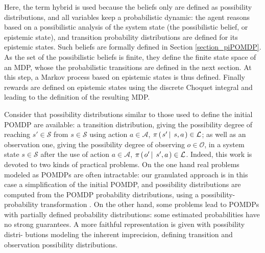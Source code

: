 Here, the term hybrid is used because the beliefs only
are defined as possibility distributions, and all variables keep a probabilistic dynamic:
the agent reasons based on a possibilistic analysis of the system state (the possibilistic belief,
or epistemic state), and transition probability distributions are defined for its epistemic states. 
Such beliefs are formally defined in Section \ref{section_piPOMDP}.
As the set of the possibilistic beliefs is finite, 
they define the finite state space of an MDP, 
whose the probabilistic transitions are defined in the next section.
At this step, a Markov process based on epistemic states
is thus defined. 
Finally rewards are defined on epistemic states 
using the discrete Choquet integral
and leading to the definition of the resulting MDP.

Consider that possibility distributions similar to those used to define the initial
POMDP are available: a transition distribution, giving the possibility degree of
reaching $s' \in \mathcal{S}$ from $s \in \mathcal{S}$
using action $a \in \mathcal{A}$,  $\pi \left( \left. s' \, \right| \left. \, s,a \right. \right) \in \mathcal{L}$; 
as well as an observation one, giving the possibility degree of observing 
$o \in \mathcal{O}$, in a system state $s \in \mathcal{S}$ 
after the use of action $a \in \mathcal{A}$, 
$\pi \left( \left. o' \, \right| \left. \, s',a \right. \right) \in \mathcal{L}$. 
Indeed, this work
is devoted to two kinds of practical problems. On the one hand real problems
modeled as POMDPs are often intractable: our granulated approach is in this
case a simplification of the initial POMDP, and possibility distributions are computed 
from the POMDP probability distributions, using a possibility-probability
transformation \cite{Dubois93onpossibility/probability}. 
On the other hand, some problems lead to POMDPs with
partially defined probability distributions: some estimated probabilities have no
strong guarantees. 
A more faithful representation is given with possibility distri-
butions modeling the inherent imprecision, defining transition and observation
possibility distributions.
